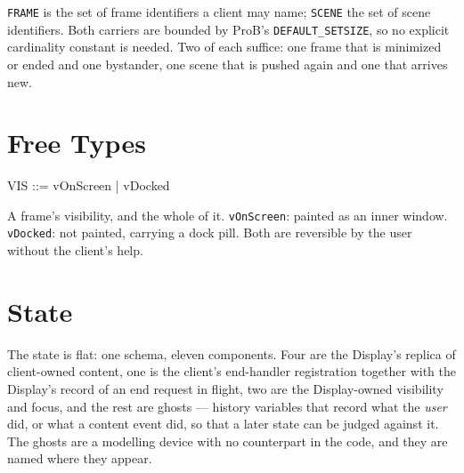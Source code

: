 \documentclass[a4paper,10pt,fleqn]{article}
\begin{document}
\begin{zed}
\end{zed}

\texttt{FRAME} is the set of frame identifiers a client may name;
\texttt{SCENE} the set of scene identifiers.  Both carriers are bounded by
ProB's \texttt{DEFAULT\_SETSIZE}, so no explicit cardinality constant is
needed.  Two of each suffice: one frame that is minimized or ended and one
bystander, one scene that is pushed again and one that arrives new.

\section{Free Types}

\begin{zed}
  VIS ::= vOnScreen | vDocked
\end{zed}

A frame's visibility, and the whole of it.  \texttt{vOnScreen}: painted as an
inner window.  \texttt{vDocked}: not painted, carrying a dock pill.  Both are
reversible by the user without the client's help.

\section{State}

The state is flat: one schema, eleven components.  Four are the Display's
replica of client-owned content, one is the client's end-handler registration
together with the Display's record of an end request in flight, two are the
Display-owned visibility and focus, and the rest are ghosts --- history
variables that record what the \emph{user} did, or what a content event did,
so that a later state can be judged against it.  The ghosts are a modelling
device with no counterpart in the code, and they are named where they appear.
\end{document}
